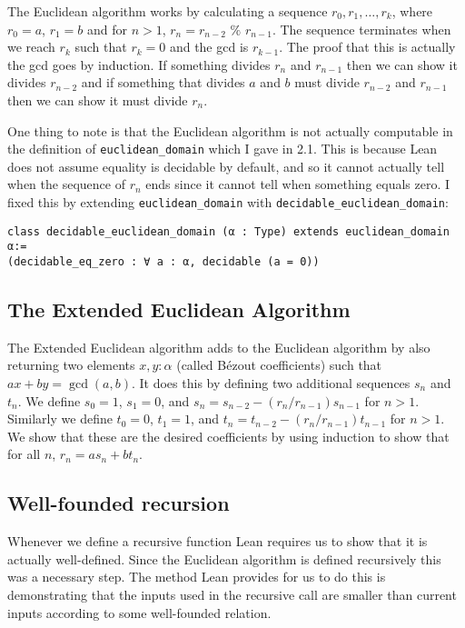 \documentclass{article}
\renewcommand{\a}{\alpha}
\newcommand{\ct}{\texttt}
\begin{document}
The Euclidean algorithm works by calculating a sequence $r_0,r_1,\ldots,r_k$, where $r_0=a$, $r_1=b$ and for $n>1$, $r_n=r_{n-2}$ $\%$ $r_{n-1}$.
The sequence terminates when we reach $r_k$ such that $r_k=0$ and the gcd is $r_{k-1}$.
The proof that this is actually the gcd goes by induction. 
If something divides $r_n$ and $r_{n-1}$ then we can show it divides $r_{n-2}$ and if something that divides $a$ and $b$ must divide $r_{n-2}$ and $r_{n-1}$ then we can show it must divide $r_n$.

One thing to note is that the Euclidean algorithm is not actually computable in the definition of \ct{euclidean\_domain} which I gave in 2.1. %
This is because Lean does not assume equality is decidable by default, and so it cannot actually tell when the sequence of $r_n$ ends since it cannot tell when something equals zero.
I fixed this by extending \ct{euclidean\_domain} with \ct{decidable\_euclidean\_domain}:
\begin{lstlisting}
class decidable_euclidean_domain (α : Type) extends euclidean_domain α:=
(decidable_eq_zero : ∀ a : α, decidable (a = 0))
\end{lstlisting}

\subsection{The Extended Euclidean Algorithm}
The Extended Euclidean algorithm adds to the Euclidean algorithm by also returning two elements $x,y:\a$ (called B\'ezout coefficients) such that $ax+by=\gcd(a,b)$.
It does this by defining two additional sequences $s_n$ and $t_n$.
We define $s_0=1$, $s_1=0$, and $s_n=s_{n-2}-(r_n/r_{n-1})s_{n-1}$ for $n>1$.
Similarly we define $t_0=0$, $t_1=1$, and $t_n=t_{n-2}-(r_n/r_{n-1})t_{n-1}$ for $n>1$.
We show that these are the desired coefficients by using induction to show that for all $n$, $r_n=as_n+bt_n$.

\subsection{Well-founded recursion}
Whenever we define a recursive function Lean requires us to show that it is actually well-defined. 
Since the Euclidean algorithm is defined recursively this was a necessary step.
The method Lean provides for us to do this is demonstrating that the inputs used in the recursive call are smaller than current inputs according to some well-founded relation.
\end{document}
